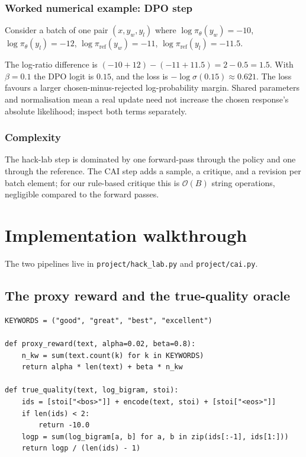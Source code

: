 \documentclass[11pt,oneside]{scrbook}
\begin{document}
\subsection*{Worked numerical example: DPO step}

Consider a batch of one pair $(x, y_w, y_l)$ where
$\log \pi_\theta(y_w) = -10$, $\log \pi_\theta(y_l) = -12$,
$\log \pi_\text{ref}(y_w) = -11$, $\log \pi_\text{ref}(y_l) = -11.5$.

The log-ratio difference is
$(-10 + 12) - (-11 + 11.5) = 2 - 0.5 = 1.5$. With $\beta = 0.1$ the
DPO logit is $0.15$, and the loss is $-\log \sigma(0.15) \approx 0.621$.
The loss favours a larger chosen-minus-rejected log-probability margin.
Shared parameters and normalisation mean a real update need not increase
the chosen response's absolute likelihood; inspect both terms separately.

\subsection*{Complexity}

The hack-lab step is dominated by one forward-pass through the policy and
one through the reference. The CAI step adds a sample, a critique, and a
revision per batch element; for our rule-based critique this is
$\mathcal{O}(B)$ string operations, negligible compared to the forward
passes.

\chapter{Implementation walkthrough}

The two pipelines live in \texttt{project/hack\_lab.py} and
\texttt{project/cai.py}.

\section{The proxy reward and the true-quality oracle}

\begin{verbatim}
KEYWORDS = ("good", "great", "best", "excellent")

def proxy_reward(text, alpha=0.02, beta=0.8):
    n_kw = sum(text.count(k) for k in KEYWORDS)
    return alpha * len(text) + beta * n_kw

def true_quality(text, log_bigram, stoi):
    ids = [stoi["<bos>"]] + encode(text, stoi) + [stoi["<eos>"]]
    if len(ids) < 2:
        return -10.0
    logp = sum(log_bigram[a, b] for a, b in zip(ids[:-1], ids[1:]))
    return logp / (len(ids) - 1)
\end{verbatim}
\end{document}

